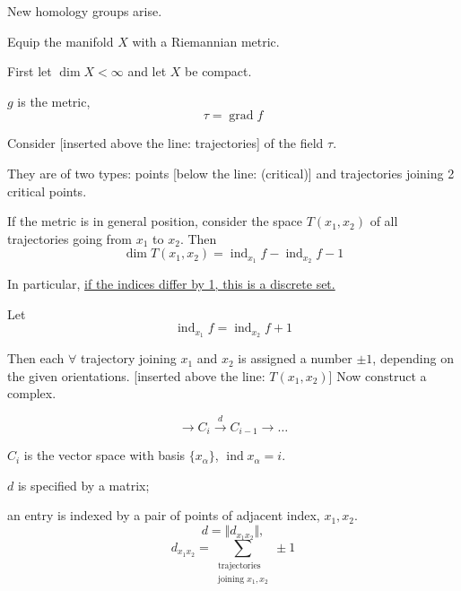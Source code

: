 New homology groups arise.

Equip the manifold $X$ with a Riemannian metric.

First let $\dim X<\infty$ and let $X$ be compact.

$g$ is the metric,
\begin{equation*}
\tau=\operatorname{grad}f
\end{equation*}

Consider 
[inserted above the line: trajectories] of the field $\tau$.

They are of two types: points [below the line: (critical)] and trajectories joining 2 critical points.

If the metric is in general position, consider the space $T(x_1,x_2)$
of all trajectories going from $x_1$ to $x_2$. Then
\begin{equation*}
\dim T(x_1,x_2)=\operatorname{ind}_{x_1}f-\operatorname{ind}_{x_2}f-1
\tag{1}
\end{equation*}

In particular, \underline{if the indices differ by 1, this is a discrete set.}

Let
\begin{equation*}
\operatorname{ind}_{x_1}f=\operatorname{ind}_{x_2}f+1
\tag{2}
\end{equation*}

Then each $\forall$ trajectory joining $x_1$ and $x_2$ is assigned a number $\pm1$,
depending on the given orientations.
[inserted above the line: $T(x_1,x_2)$] Now construct a complex.

\begin{equation*}
\longrightarrow C_i\overset{d}{\longrightarrow}C_{i-1}\longrightarrow\ldots
\tag{3}
\end{equation*}

$C_i$ is the vector space with basis $\{x_\alpha\}$, $\operatorname{ind}x_\alpha=i$.

$d$ is specified by a matrix;

an entry is indexed by a pair of points of adjacent index, $x_1,x_2$.
\begin{equation*}
d=\Vert d_{x_1x_2}\Vert,
\end{equation*}
\begin{equation*}
d_{x_1x_2}=\sum_{\substack{\text{trajectories}\\\text{joining }x_1,x_2}}\pm1
\tag{4}
\end{equation*}

